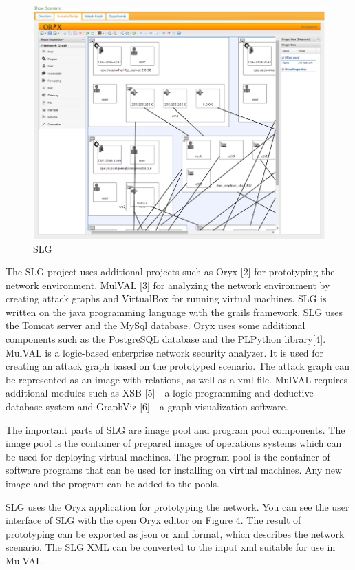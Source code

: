 \begin{figure}[ht!]
\centering
\includegraphics[width=\textwidth]{slg.png}
\caption{SLG}
\label{overflow}
\end{figure} 

The SLG project uses additional projects such as Oryx [2] for prototyping the network environment, MulVAL [3] for analyzing the network environment by creating attack graphs and VirtualBox for running virtual machines. SLG is written on the java programming language with the grails framework. SLG uses the Tomcat server and the MySql database. Oryx uses some additional components such as the PostgreSQL database and the PLPython library[4]. MulVAL is a logic-based enterprise network security analyzer. It is used for creating an attack graph based on the prototyped scenario. The attack graph can be represented as an image with relations, as well as a xml file. MulVAL requires additional modules such as XSB [5] - a logic programming and deductive database system and GraphViz [6] - a graph visualization software. 

The important parts of SLG are image pool and program pool components. The image pool is the container of prepared images of operations systems which can be used for deploying virtual machines. The program pool is the container of software programs that can be used for installing on virtual machines. Any new image and the program can be added to the pools.

SLG uses the Oryx application for prototyping the network. You can see the user interface of SLG with the open Oryx editor on Figure 4. The result of prototyping can be exported as json or xml format, which describes the network scenario. The SLG XML can be converted to the input xml suitable for use in MulVAL. 

